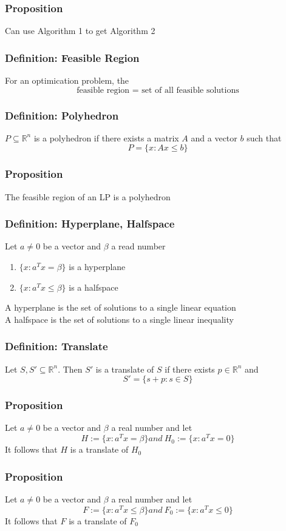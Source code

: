 \documentclass[11pt]{article}
\newcommand{\R}{{\mathbb{R}}}
\begin{document}
\subsubsection*{Proposition}
Can use Algorithm 1 to get Algorithm 2
\subsubsection{Definition: Feasible Region}
For an optimication problem, the \[\text{feasible region } = \text{ set of all feasible solutions}\]
\subsubsection{Definition: Polyhedron}
$P\subseteq\R^n$ is a polyhedron if there exists a matrix $A$ and a vector $b$ such that \[P=\{x:Ax\leq b\}\]
\subsubsection{Proposition}
The feasible region of an LP is a polyhedron
\subsubsection{Definition: Hyperplane, Halfspace}
Let $a\neq0$ be a vector and $\beta$ a read number 
\begin{enumerate}
  \item $\{x:a^Tx=\beta\}$ is a hyperplane 
  \item $\{x:a^Tx\leq\beta\}$ is a halfspace 
\end{enumerate}
A hyperplane is the set of solutions to a single linear equation \\
A halfspace is the set of solutions to a single linear inequality 
\subsubsection{Definition: Translate}
Let $S,S'\subseteq\R^n$. Then $S'$ is a translate of $S$ if there exists $p\in\R^n$ and \[S'=\{s+p:s\in S\}\]
\subsubsection{Proposition}
Let $a\neq0$ be a vector and $\beta$ a real number and let 
\[H:=\{x:a^Tx=\beta\} and\ H_0:=\{x:a^Tx=0\}\]
It follows that $H$ is a translate of $H_0$
\subsubsection{Proposition}
Let $a\neq0$ be a vector and $\beta$ a real number and let 
\[F:=\{x:a^Tx\leq\beta\}and\ F_0:=\{x:a^Tx\leq0\}\]
It follows that $F$ is a translate of $F_0$
\end{document}

